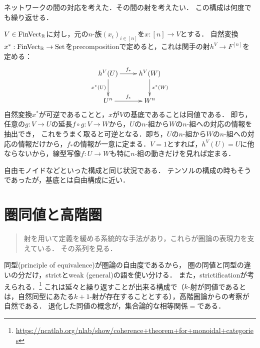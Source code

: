 \documentclass[uplatex,dvipdfmx]{jsreport}
\begin{document}
\begin{tcolorbox}[colframe=ForestGreen, colback=ForestGreen!10!white, breakable ,colbacktitle=ForestGreen!40!white, coltitle=black,fonttitle=\bfseries\sffamily,
    title=]
    ネットワークの間の対応を考えた．その間の射を考えたい．
    この構成は何度でも繰り返せる．
\end{tcolorbox}

\begin{example}[基底とは可逆な関手の射のことである]
    $V\in\mathrm{FinVect}_{\mathbb{R}}$に対し，元の$n$-族$(x_i)_{i\in[n]}$を$x:[n]\to V$とする．
    自然変換$x^*:\mathrm{FinVect}_{\mathbb{R}}\to\mathrm{Set}$をprecompositionで定めると，これは関手の射$h^V\to F^{[n]}$を定める：
    \[\xymatrix{
        h^V(U)\ar[r]^-{f_*}\ar[d]_-{x^*(U)}&h^V(W)\ar[d]^-{x^*(W)}\\
        U^n\ar[r]^-{f_*}&W^n
    }\]
    自然変換$x^*$が可逆であることと，$x$が$V$の基底であることは同値である．
    即ち，任意の$g:V\to U$の延長$f\circ g:V\to W$から，$U$の$n$-組から$W$の$n$-組への対応の情報を抽出でき，
    これをうまく取ると可逆となる．即ち，$U$の$n$-組から$W$の$n$-組への対応の情報だけから，$f_*$の情報が一意に定まる．$V=1$とすれば，$h^V(U)=U$に他ならないから，線型写像$f:U\to W$も特に$n$-組の動きだけを見れば定まる．
\end{example}
\begin{remarks}
    自由モノイドなどといった構成と同じ状況である．
    テンソルの構成の時もそうであったが，基底とは自由構成に近い．
\end{remarks}



\chapter{圏同値と高階圏}

\begin{quotation}
    射を用いて定義を緩める系統的な手法があり，これらが圏論の表現力を支えている．
    その系列を見る．
\end{quotation}

\begin{tcolorbox}[colframe=ForestGreen, colback=ForestGreen!10!white, breakable ,colbacktitle=ForestGreen!40!white, coltitle=black,fonttitle=\bfseries\sffamily,
    title=相等の概念も射の言葉で取り込む．これがequivalenceの概念である．高階圏の世界観が広がる．]
    同型(principle of equivalence)が圏論の自由度であるから，
    圏の同値と同型の違いの分だけ，strictとweak (general)の語を使い分ける．
    また，strictificationが考えられる．\footnote{\url{https://ncatlab.org/nlab/show/coherence+theorem+for+monoidal+categories}}
    これは延々と繰り返すことが出来る構成で（$k$-射が同値であるとは，自然同型にあたる$k+1$-射が存在することとする），高階圏論からの考察が自然である．
    退化した同値の概念が，集合論的な相等関係$=$である．
\end{tcolorbox}
\end{document}
